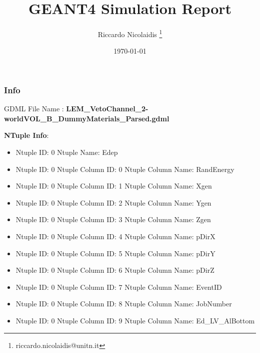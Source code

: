 \documentclass[8pt]{beamer}
\title{GEANT4 Simulation Report}
\author{Riccardo Nicolaidis \footnote{riccardo.nicolaidis@unitn.it}}
\date{\today}
\begin{document}
        
            \begin{frame}
                \titlepage
            \end{frame}
            
            \begin{frame}
                \frametitle{Info}
            
                \centering
                GDML File Name : \textbf{ LEM\_VetoChannel\_2-worldVOL\_B\_DummyMaterials\_Parsed.gdml}
                
                
                \vspace{2 cm}
                \textbf{NTuple Info}:
                \vspace{1 cm}
                
        \begin{itemize}
        
        \item Ntuple ID: 0 Ntuple Name: Edep
        
        \item Ntuple ID: 0 Ntuple Column ID: 0 Ntuple Column Name: RandEnergy
        
        \item Ntuple ID: 0 Ntuple Column ID: 1 Ntuple Column Name: Xgen
        
        \item Ntuple ID: 0 Ntuple Column ID: 2 Ntuple Column Name: Ygen
        
        \item Ntuple ID: 0 Ntuple Column ID: 3 Ntuple Column Name: Zgen
        
        \item Ntuple ID: 0 Ntuple Column ID: 4 Ntuple Column Name: pDirX
        
        \item Ntuple ID: 0 Ntuple Column ID: 5 Ntuple Column Name: pDirY
        
        \item Ntuple ID: 0 Ntuple Column ID: 6 Ntuple Column Name: pDirZ
        
        \item Ntuple ID: 0 Ntuple Column ID: 7 Ntuple Column Name: EventID
        
        \item Ntuple ID: 0 Ntuple Column ID: 8 Ntuple Column Name: JobNumber
        
        \item Ntuple ID: 0 Ntuple Column ID: 9 Ntuple Column Name: Ed\_LV\_AlBottom
        

\end{itemize}
\end{frame}
\end{document}
